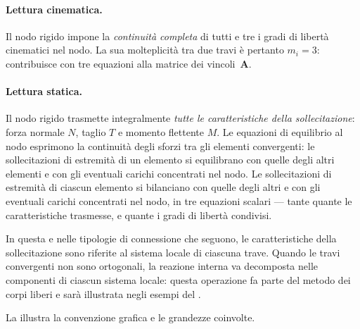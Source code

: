 \paragraph{Lettura cinematica.}
Il nodo rigido impone la \emph{continuità completa}
di tutti e tre i gradi di libertà cinematici nel nodo.
La sua molteplicità tra due travi è pertanto $m_i = 3$:
contribuisce con tre equazioni alla matrice dei vincoli~$\bm{A}$.

\paragraph{Lettura statica.}
Il nodo rigido trasmette integralmente \emph{tutte le
	caratteristiche della sollecitazione}: forza normale $N$,
taglio $T$ e momento flettente $M$.
Le equazioni di equilibrio al nodo esprimono la continuità
degli sforzi tra gli elementi convergenti: le sollecitazioni
di estremità di un elemento si equilibrano con quelle degli
altri elementi e con gli eventuali carichi concentrati nel
nodo. Le sollecitazioni di estremità di ciascun elemento si bilanciano
con quelle degli altri e con gli eventuali carichi concentrati nel
nodo, in tre equazioni scalari --- tante quante le caratteristiche
trasmesse, e quante i gradi di libertà condivisi.

In questa e nelle tipologie di connessione che seguono,
le caratteristiche della sollecitazione sono riferite al
sistema locale di ciascuna trave. Quando le travi
convergenti non sono ortogonali, la reazione interna
va decomposta nelle componenti di ciascun sistema locale:
questa operazione fa parte del metodo dei corpi liberi
e sarà illustrata negli esempi del .


La  illustra la convenzione
grafica e le grandezze coinvolte.


